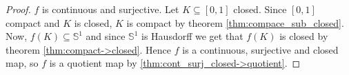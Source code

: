 \begin{proof}
  \( f \) is continuous and surjective.
  Let \( K \subseteq [0, 1] \) closed.
  Since \( [0, 1] \) compact and \( K \) is closed,
 \( K \) is compact by theorem \ref{thm:compace_sub_closed}.
  Now, \( f(K) \subseteq \mathbb{S}^1 \) and since
  \( \mathbb{S}^1 \) is Hausdorff we get that
  \( f(K) \) is closed by theorem \ref{thm:compact->closed}.
  Hence \( f \) is a continuous, surjective and closed map,
  so \( f \) is a quotient map by \ref{thm:cont_surj_closed->quotient}.
\end{proof}

